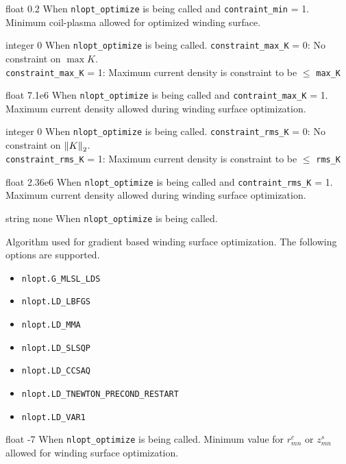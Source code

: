 {float}
{0.2}
{When \texttt{nlopt\_optimize} is being called and \texttt{contraint\_min} = 1.}
{Minimum coil-plasma allowed for optimized winding surface.}
 
 \myhrule
 
{integer}
{0}
{When \texttt{nlopt\_optimize} is being called.}
{\texttt{constraint\_max\_K} = 0: No constraint on $\max K$. \\
 \texttt{constraint\_max\_K} = 1: Maximum current density is constraint to be $\leq$ \texttt{max\_K}}
 
\myhrule

{float}
{7.1e6}
{When \texttt{nlopt\_optimize} is being called and \texttt{contraint\_max\_K} = 1.}
{Maximum current density allowed during winding surface optimization. }

\myhrule

{integer}
{0}
{When \texttt{nlopt\_optimize} is being called.}
{\texttt{constraint\_rms\_K} = 0: No constraint on $\norm{K}_2$. \\
 \texttt{constraint\_rms\_K} = 1: Maximum current density is constraint to be $\leq$ \texttt{rms\_K}}
 
\myhrule

{float}
{2.36e6}
{When \texttt{nlopt\_optimize} is being called and \texttt{contraint\_rms\_K} = 1.}
{Maximum current density allowed during winding surface optimization. }

\myhrule

{string}
{none}
{When \texttt{nlopt\_optimize} is being called. }
{Algorithm used for gradient based winding surface optimization. The following options are supported.
\begin{itemize}
\item \texttt{nlopt.G\_MLSL\_LDS}
\item \texttt{nlopt.LD\_LBFGS}
\item \texttt{nlopt.LD\_MMA}
\item \texttt{nlopt.LD\_SLSQP} 
\item \texttt{nlopt.LD\_CCSAQ}
\item \texttt{nlopt.LD\_TNEWTON\_PRECOND\_RESTART}
\item \texttt{nlopt.LD\_VAR1}
\end{itemize}
}

\myhrule

{float}
{-7}
{When \texttt{nlopt\_optimize} is being called. }
{Minimum value for $r_{mn}^c$ or $z_{mn}^s$ allowed for winding surface optimization.}

